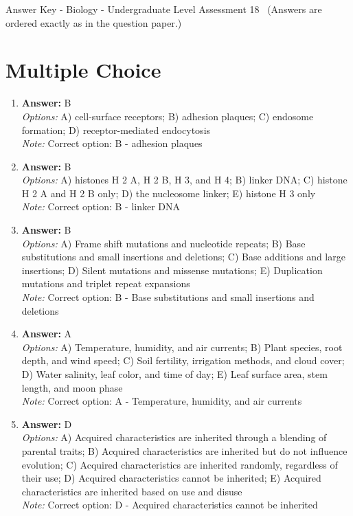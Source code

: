 \documentclass[12pt]{article}
\begin{document}
\begin{center}
Answer Key - Biology - Undergraduate Level Assessment 18 \
\small (Answers are ordered exactly as in the question paper.)
\end{center}

\section*{Multiple Choice}
\begin{enumerate}[label=\arabic*.]
\item \textbf{Answer:} B
\\ \textit{Options:} A) cell-surface receptors; B) adhesion plaques; C) endosome formation; D) receptor-mediated endocytosis
\\ \textit{Note:} Correct option: B - adhesion plaques
\item \textbf{Answer:} B
\\ \textit{Options:} A) histones H 2 A, H 2 B, H 3, and H 4; B) linker DNA; C) histone H 2 A and H 2 B only; D) the nucleosome linker; E) histone H 3 only
\\ \textit{Note:} Correct option: B - linker DNA
\item \textbf{Answer:} B
\\ \textit{Options:} A) Frame shift mutations and nucleotide repeats; B) Base substitutions and small insertions and deletions; C) Base additions and large insertions; D) Silent mutations and missense mutations; E) Duplication mutations and triplet repeat expansions
\\ \textit{Note:} Correct option: B - Base substitutions and small insertions and deletions
\item \textbf{Answer:} A
\\ \textit{Options:} A) Temperature, humidity, and air currents; B) Plant species, root depth, and wind speed; C) Soil fertility, irrigation methods, and cloud cover; D) Water salinity, leaf color, and time of day; E) Leaf surface area, stem length, and moon phase
\\ \textit{Note:} Correct option: A - Temperature, humidity, and air currents
\item \textbf{Answer:} D
\\ \textit{Options:} A) Acquired characteristics are inherited through a blending of parental traits; B) Acquired characteristics are inherited but do not influence evolution; C) Acquired characteristics are inherited randomly, regardless of their use; D) Acquired characteristics cannot be inherited; E) Acquired characteristics are inherited based on use and disuse
\\ \textit{Note:} Correct option: D - Acquired characteristics cannot be inherited
\end{enumerate}
\end{document}
